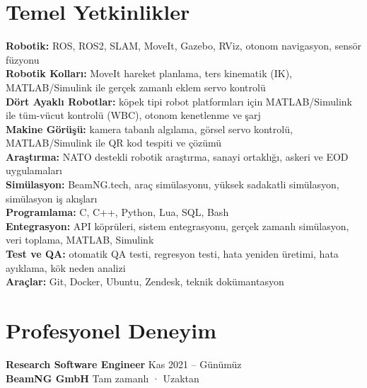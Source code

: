 \documentclass[11pt,a4paper]{article}
\begin{document}
\section*{Temel Yetkinlikler}

{\small
\textbf{\color{PrimaryColor}Robotik:} ROS, ROS2, SLAM, MoveIt, Gazebo, RViz, otonom navigasyon, sensör füzyonu\\
\textbf{\color{PrimaryColor}Robotik Kolları:} MoveIt hareket planlama, ters kinematik (IK), MATLAB/Simulink ile gerçek zamanlı eklem servo kontrolü\\
\textbf{\color{PrimaryColor}Dört Ayaklı Robotlar:} köpek tipi robot platformları için MATLAB/Simulink ile tüm-vücut kontrolü (WBC), otonom kenetlenme ve şarj\\
\textbf{\color{PrimaryColor}Makine Görüşü:} kamera tabanlı algılama, görsel servo kontrolü, MATLAB/Simulink ile QR kod tespiti ve çözümü\\
\textbf{\color{PrimaryColor}Araştırma:} NATO destekli robotik araştırma, sanayi ortaklığı, askeri ve EOD uygulamaları\\
\textbf{\color{PrimaryColor}Simülasyon:} BeamNG.tech, araç simülasyonu, yüksek sadakatli simülasyon, simülasyon iş akışları\\
\textbf{\color{PrimaryColor}Programlama:} C, C++, Python, Lua, SQL, Bash\\
\textbf{\color{PrimaryColor}Entegrasyon:} API köprüleri, sistem entegrasyonu, gerçek zamanlı simülasyon, veri toplama, MATLAB, Simulink\\
\textbf{\color{PrimaryColor}Test ve QA:} otomatik QA testi, regresyon testi, hata yeniden üretimi, hata ayıklama, kök neden analizi\\
\textbf{\color{PrimaryColor}Araçlar:} Git, Docker, Ubuntu, Zendesk, teknik dokümantasyon
}

\section*{Profesyonel Deneyim}

\textbf{\color{PrimaryColor}Research Software Engineer} \hfill Kas 2021 -- Günümüz\\
\textbf{BeamNG GmbH} \hfill Tam zamanlı · Uzaktan
\end{document}
